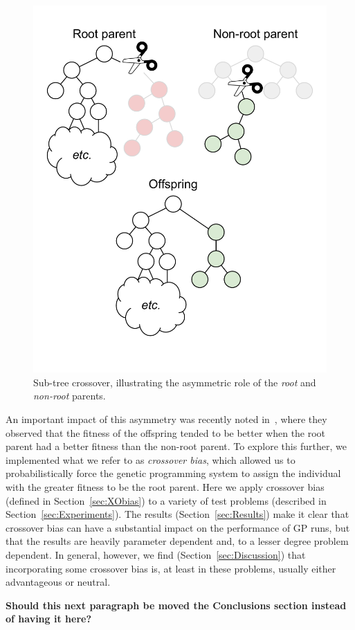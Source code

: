 \documentclass{sig-alternate}
\begin{document}
\begin{figure}
\centering
\includegraphics[width=0.45 \textwidth]{Plots/Root_parent_illustration_no_triangle.pdf}
\caption{Sub-tree crossover, illustrating the asymmetric role of the \emph{root} and \emph{non-root} parents.}
\label{fig:root_parent_illustration}
\end{figure}

An important impact of this asymmetry was recently noted in~\cite{McPheeDonatucciDramdahl:2014},
where they observed that the fitness of the offspring tended to be better when the root parent had a better 
fitness than
the non-root parent.
To explore this further, we implemented what we refer to as \emph{crossover bias}, which allowed us to
probabilistically force the genetic programming system to assign the individual with the greater 
fitness to be the root parent. Here we apply crossover bias (defined in Section~\ref{sec:XObias}) 
to a variety of test problems (described in Section~\ref{sec:Experiments}). The results 
(Section~\ref{sec:Results}) make it clear that crossover bias can have a substantial impact on the 
performance of GP runs, but that the results are heavily parameter dependent and, to a lesser degree 
problem dependent. In general, however, we find (Section~\ref{sec:Discussion}) that incorporating 
some crossover bias is, at least in these problems, usually either advantageous or neutral. 

\textbf{Should this next paragraph be moved the Conclusions section instead of having it here?}
\end{document}
